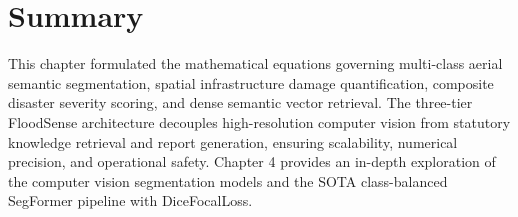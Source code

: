 \section{Summary}
This chapter formulated the mathematical equations governing multi-class aerial semantic segmentation, spatial infrastructure damage quantification, composite disaster severity scoring, and dense semantic vector retrieval. The three-tier FloodSense architecture decouples high-resolution computer vision from statutory knowledge retrieval and report generation, ensuring scalability, numerical precision, and operational safety. Chapter 4 provides an in-depth exploration of the computer vision segmentation models and the SOTA class-balanced SegFormer pipeline with DiceFocalLoss.
